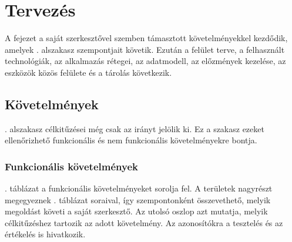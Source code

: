 \chapter{Tervezés}
\label{ch:requirements}

A fejezet a saját szerkesztővel szemben támasztott követelményekkel kezdődik, amelyek . alszakasz szempontjait követik. Ezután a felület terve, a felhasznált technológiák, az alkalmazás rétegei, az adatmodell, az előzmények kezelése, az eszközök közös felülete és a tárolás következik.

\section{Követelmények}
\label{sec:requirements}

. alszakasz célkitűzései még csak az irányt jelölik ki. Ez a szakasz ezeket ellenőrizhető funkcionális és nem funkcionális követelményekre bontja.

\subsection{Funkcionális követelmények}

. táblázat a funkcionális követelményeket sorolja fel. A területek nagyrészt megegyeznek . táblázat soraival, így szempontonként összevethető, melyik megoldást követi a saját szerkesztő. Az utolsó oszlop azt mutatja, melyik célkitűzéshez tartozik az adott követelmény. Az azonosítókra a tesztelés és az értékelés is hivatkozik.

